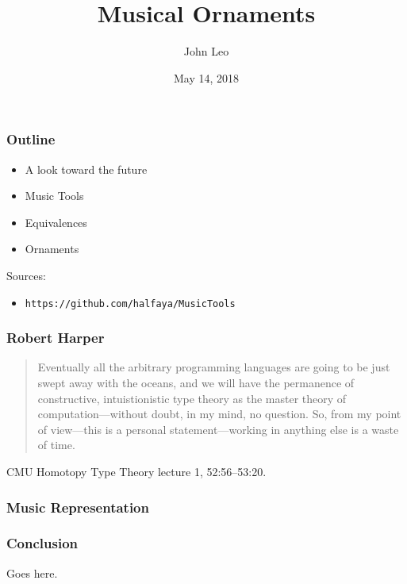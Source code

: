 \documentclass{beamer}
\title{Musical Ornaments}
\author{John Leo}
\institute{Halfaya Research}
\date{May 14, 2018}
\begin{document}
 
\frame{\titlepage}
 
\begin{frame}\frametitle{Outline}
\begin{itemize}
\item A look toward the future
\item Music Tools
\item Equivalences
\item Ornaments
\end{itemize}

\bigskip 
Sources:
\begin{itemize}
\item {\tt https://github.com/halfaya/MusicTools}
\end{itemize}
\end{frame}

\begin{frame}\frametitle{Robert Harper}
\begin{quote}
Eventually all the arbitrary programming languages are going to be just swept away with the oceans,
and we will have the permanence of constructive, intuistionistic type theory as the master theory
of computation---without doubt, in my mind, no question.  So, from my point of view---this is a personal
statement---working in anything else is a waste of time.
\end{quote}

CMU Homotopy Type Theory lecture 1, 52:56--53:20.
\end{frame}

\begin{frame}\frametitle{Music Representation}
\end{frame}

\begin{frame}\frametitle{Conclusion}
Goes here.
\end{frame}
\end{document}
